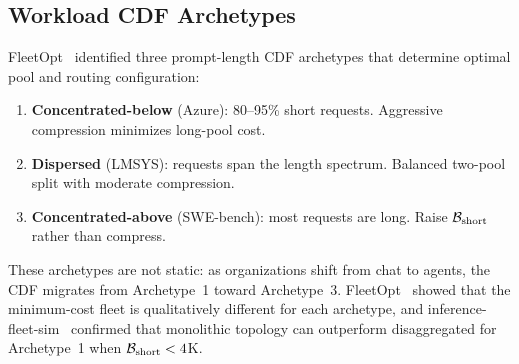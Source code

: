 \subsection{Workload CDF Archetypes}
\label{sec:workload:archetypes}

FleetOpt~\cite{fleetopt2026} identified three prompt-length CDF
archetypes that determine optimal pool and routing configuration:

\begin{enumerate}[nosep]
  \item \textbf{Concentrated-below} (\eg Azure): 80--95\% short
        requests.  Aggressive compression minimizes long-pool cost.
  \item \textbf{Dispersed} (\eg LMSYS): requests span the length
        spectrum.  Balanced two-pool split with moderate compression.
  \item \textbf{Concentrated-above} (\eg SWE-bench): most requests
        are long.  Raise $\mathcal{B}_{\text{short}}$ rather than
        compress.
\end{enumerate}

These archetypes are not static: as organizations shift from chat to
agents, the CDF migrates from Archetype~1 toward Archetype~3.
FleetOpt~\cite{fleetopt2026} showed that the minimum-cost fleet is
qualitatively different for each archetype, and
inference-fleet-sim~\cite{fleetsim2026} confirmed that monolithic
topology can outperform disaggregated for Archetype~1 when
$\mathcal{B}_{\text{short}} < 4$K.


